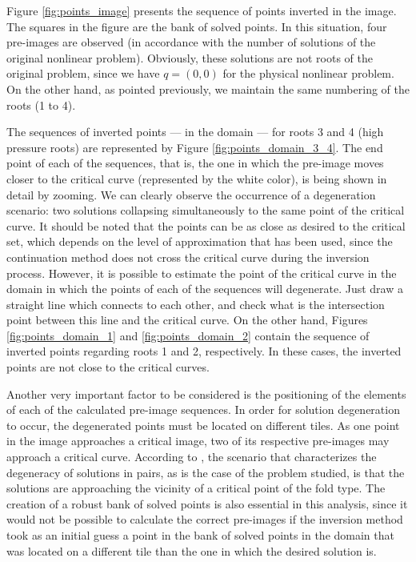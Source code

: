 \documentclass[journal=iecred,manuscript=article]{achemso}
\theoremstyle{definition}
\theoremstyle{remark}
\begin{document}
Figure \ref{fig:points_image} presents the sequence of points inverted in the image. The squares in the figure are the bank of solved points. In this situation, four pre-images are observed (in accordance with the number of solutions of the original nonlinear problem). Obviously, these solutions are not roots of the original problem, since we have $ q = \left(0,0\right) $ for the physical nonlinear problem. On the other hand, as pointed previously, we maintain the same numbering of the roots (1 to 4).

The sequences of inverted points --- in the domain --- for roots 3 and 4 (high pressure roots) are represented by Figure \ref{fig:points_domain_3_4}. The end point of each of the sequences, that is, the one in which the pre-image moves closer to the critical curve (represented by the white color), is being shown in detail by zooming. We can clearly observe the occurrence of a degeneration scenario: two solutions collapsing simultaneously to the same point of the critical curve. It should be noted that the points can be as close as desired to the critical set, which depends on the level of approximation that has been used, since the continuation method does not cross the critical curve during the inversion process. However, it is possible to estimate the point of the critical curve in the domain in which the points of each of the sequences will degenerate. Just draw a straight line which connects to each other, and check what is the intersection point between this line and the critical curve. On the other hand, Figures \ref{fig:points_domain_1} and \ref{fig:points_domain_2} contain the sequence of inverted points regarding roots 1 and 2, respectively. In these cases, the inverted points are not close to the critical curves.

Another very important factor to be considered is the positioning of the elements of each of the calculated pre-image sequences. In order for solution degeneration to occur, the degenerated points must be located on different tiles. As one point in the image approaches a critical image, two of its respective pre-images may approach a critical curve. According to \citet{malta}, the scenario that characterizes the degeneracy of solutions in pairs, as is the case of the problem studied, is that the solutions are approaching the vicinity of a critical point of the fold type. The creation of a robust bank of solved points is also essential in this analysis, since it would not be possible to calculate the correct pre-images if the inversion method took as an initial guess a point in the bank of solved points in the domain that was located on a different tile than the one in which the desired solution is.
\end{document}
